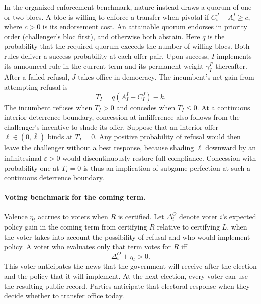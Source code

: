 \documentclass[11pt,letterpaper]{article}
\begin{document}
In the organized-enforcement benchmark, nature instead draws a quorum of one or two blocs. A bloc is willing to enforce a transfer when pivotal if $C_i^J-A_i^I\ge c$, where $c>0$ is its endorsement cost. An attainable quorum endorses in priority order (challenger's bloc first), and otherwise both abstain. Here $q$ is the probability that the required quorum exceeds the number of willing blocs. Both rules deliver a success probability at each offer pair. Upon success, $I$ implements its announced rule in the current term and its permanent weight $\gamma_I^P$ thereafter. After a failed refusal, $J$ takes office in democracy. The incumbent's net gain from attempting refusal is
\begin{equation}
 T_I=q(A_I^I-C_I^J)-k .
 \label{eq:gain}
\end{equation}
The incumbent refuses when $T_I>0$ and concedes when $T_I\le 0$. At a continuous interior deterrence boundary, concession at indifference also follows from the challenger's incentive to shade its offer. Suppose that an interior offer $\ell\in(0,\bar\ell)$ binds at $T_I=0$. Any positive probability of refusal would then leave the challenger without a best response, because shading $\ell$ downward by an infinitesimal $\varepsilon>0$ would discontinuously restore full compliance. Concession with probability one at $T_I=0$ is thus an implication of subgame perfection at such a continuous deterrence boundary.

\paragraph{Voting benchmark for the coming term.}
Valence $\eta_t$ accrues to voters when $R$ is certified. Let $\Delta_i^O$ denote voter $i$'s expected policy gain in the coming term from certifying $R$ relative to certifying $L$, when the voter takes into account the possibility of refusal and who would implement policy. A voter who evaluates only that term votes for $R$ iff
\begin{equation}
 \Delta_i^O+\eta_t>0. \label{eq:comingterm}
\end{equation}
This voter anticipates the news that the government will receive after the election and the policy that it will implement. At the next election, every voter can use the resulting public record. Parties anticipate that electoral response when they decide whether to transfer office today.
\end{document}
